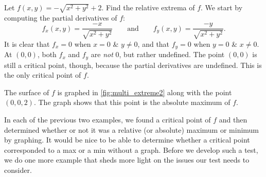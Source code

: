 \begin{example}\label{ex_multi_extreme2}%
Let $f(x,y) = -\sqrt{x^2+y^2}+2$. Find the relative extrema of $f$.
\solution
We start by computing the partial derivatives of $f$:
\[f_x(x,y) = \frac{-x}{\sqrt{x^2+y^2}}\qquad \text{and}\qquad f_y(x,y) = \frac{-y}{\sqrt{x^2+y^2}}.\]
It is clear that $f_x=0$ when $x=0$ \& $y\neq0$, and that $f_y=0$ when $y=0$ \& $x\neq0$. At $(0,0)$, both $f_x$ and $f_y$ are \emph{not} $0$, but rather undefined.
The point $(0,0)$ is still a critical point, though, because the partial derivatives are undefined. This is the only critical point of $f$.


The surface of $f$ is graphed in \autoref{fig:multi_extreme2} along with the point $(0,0,2)$. The graph shows that this point is the absolute maximum of $f$.
\end{example}

In each of the previous two examples, we found a critical point of $f$ and then determined whether or not it was a relative (or absolute) maximum or minimum by graphing. It would be nice to be able to determine whether a critical point corresponded to a max or a min without a graph. Before we develop such a test, we do one more example that sheds more light on the issues our test needs to consider.

